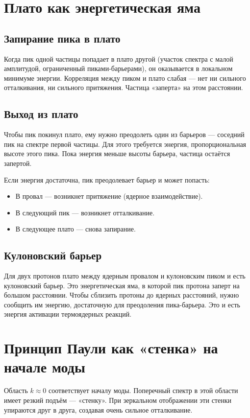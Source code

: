 \documentclass[12pt,a4paper]{article}
\begin{document}
\section{Плато как энергетическая яма}

\subsection{Запирание пика в плато}
Когда пик одной частицы попадает в плато другой (участок спектра с малой амплитудой, ограниченный пиками-барьерами), он оказывается в локальном минимуме энергии. Корреляция между пиком и плато слабая --- нет ни сильного отталкивания, ни сильного притяжения. Частица «заперта» на этом расстоянии.

\subsection{Выход из плато}
Чтобы пик покинул плато, ему нужно преодолеть один из барьеров --- соседний пик на спектре первой частицы. Для этого требуется энергия, пропорциональная высоте этого пика. Пока энергия меньше высоты барьера, частица остаётся запертой.

Если энергия достаточна, пик преодолевает барьер и может попасть:
\begin{itemize}
    \item В провал --- возникнет притяжение (ядерное взаимодействие).
    \item В следующий пик --- возникнет отталкивание.
    \item В следующее плато --- снова запирание.
\end{itemize}

\subsection{Кулоновский барьер}
Для двух протонов плато между ядерным провалом и кулоновским пиком и есть кулоновский барьер. Это энергетическая яма, в которой пик протона заперт на большом расстоянии. Чтобы сблизить протоны до ядерных расстояний, нужно сообщить им энергию, достаточную для преодоления пика-барьера. Это и есть энергия активации термоядерных реакций.

\section{Принцип Паули как «стенка» на начале моды}
Область $k \approx 0$ соответствует началу моды. Поперечный спектр в этой области имеет резкий подъём --- «стенку». При зеркальном отображении эти стенки упираются друг в друга, создавая очень сильное отталкивание.
\end{document}
